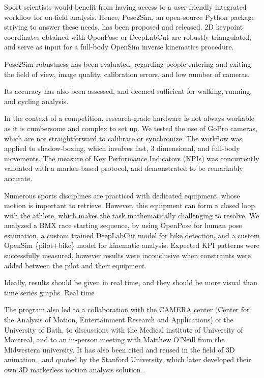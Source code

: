 Sport scientists would benefit from having access to a user-friendly integrated workflow for on-field analysis. Hence, Pose2Sim, an open-source Python package striving to answer these needs, has been proposed and released. 2D keypoint coordinates obtained with OpenPose or DeepLabCut are robustly triangulated, and serve as input for a full-body OpenSim inverse kinematics procedure.

Pose2Sim robustness has been evaluated, regarding people entering and exiting the field of view, image quality, calibration errors, and low number of cameras. 

Its accuracy has also been assessed, and deemed sufficient for walking, running, and cycling analysis. 

In the context of a competition, research-grade hardware is not always workable as it is cumbersome and complex to set up. We tested the use of GoPro cameras, which are not straightforward to calibrate or synchronize. The workflow was applied to shadow-boxing, which involves fast, 3 dimensional, and full-body movements. The measure of Key Performance Indicators (KPIs) was concurrently validated with a marker-based protocol, and demonstrated to be remarkably accurate.

Numerous sports disciplines are practiced with dedicated equipment, whose motion is important to retrieve. However, this equipment can form a closed loop with the athlete, which makes the task mathematically challenging to resolve. We analyzed a BMX race starting sequence, by using OpenPose for human pose estimation, a custom trained DeepLabCut model for bike detection, and a custom OpenSim \{pilot+bike\} model for kinematic analysis. Expected KPI patterns were successfully measured, however results were inconclusive when constraints were added between the pilot and their equipment.



Ideally, results should be given in real time, and they should be more visual than time series graphs. 
Real time


The program also led to a collaboration with the CAMERA center (Center for the Analysis of Motion, Entertainment Research and Applications) of the University of Bath, to discussions with the Medical institute of University of Montreal, and to an in-person meeting with Matthew O'Neill from the Midwestern university. It has also been cited and reused in the field of 3D animation \cite{Barreto2022}, and quoted by the Stanford University, which later developed their own 3D markerless motion analysis solution \cite{Uhlrich2022}.

